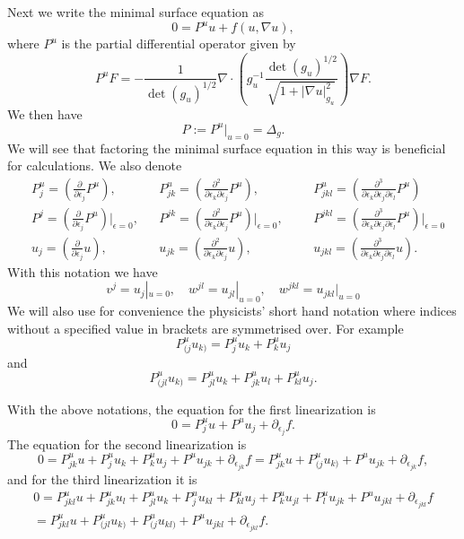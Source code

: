 \documentclass[12pt]{amsart}
\def\p{\partial}
\theoremstyle{definition}
\theoremstyle{remark}
\newcommand{\abs}[1]{\lvert #1 \rvert}
\newcommand{\eps}{\epsilon}
\begin{document}
Next we write the minimal surface equation as 
\begin{equation*}%
 0=%
 P^uu+f(u,\nabla u ), 
\end{equation*}
where $P^u$ is the partial differential operator given by
\[
 P^uF=-\frac{1}{\det(g_u)^{1/2}}\nabla\cdot \left( g_u^{-1}\frac{\det(g_u)^{1/2}}{\sqrt{1+\abs{\nabla u}^2_{g_u}}} \right)\nabla F. 
\]
We then have
\[
 P:=P^{u}|_{u=0}=\Delta_g.
\]
We will see that factoring the minimal surface equation in this way is beneficial for calculations.  We also denote
\begin{align*}
 &P_{j}^u=\left(\frac{\p}{\p \eps_j}P^u\right), && P_{jk}^u=\left(\frac{\p^2}{\p \eps_k \p \eps_j}P^u\right),  &&& P_{jkl}^u=\left(\frac{\p^3}{\p \eps_k \p \eps_j\p\eps_l}P^u\right) \\ 
 &P^j=\left(\frac{\p}{\p \eps_j}P^u\right)\Big|_{\eps=0}, && P^{jk}=\left(\frac{\p^2}{\p \eps_k \p \eps_j}P^u\right)\Big|_{\eps=0},  &&& P^{jkl}=\left(\frac{\p^3}{\p \eps_k \p \eps_j\p\eps_l}P^u\right)\Big|_{\eps=0} \\
 &u_j=\left(\frac{\p}{\p \eps_j}u\right), && u_{jk}=\left(\frac{\p^2}{\p \eps_k \p \eps_j}u\right), &&& u_{jkl}=\left(\frac{\p^3}{\p \eps_k \p \eps_j\p \eps_l}u\right).
\end{align*}
With this notation we have
\[
 v^{j}=u_j|_{u=0}, \quad w^{jl}=u_{jl}|_{u=0}, \quad w^{jkl}=u_{jkl}|_{u=0}
\]
We will also use for convenience the physicists' short hand notation where indices without a specified value in brackets are symmetrised over. For example
\[
 P^u_{(j}u_{k)}=P^u_{j}u_{k}+P^u_{k}u_{j}
\]
and
\[
 P^u_{(jl}u_{k)}=P^u_{jl}u_{k}+P^u_{jk}u_{l}+P^u_{kl}u_{j}.
\]



With the above notations, the equation for the first linearization is
\[
 0=P_j^uu+P^uu_j+\p_{\eps_j}f.
\]
The equation for the second linearization is
\[
 0=P_{jk}^uu+P_{j}^uu_{k} +P_k^uu_j +P^u u_{jk}+\p_{\eps_{jk}}f =P^u_{jk}u+P^u_{(j}u_{k)}+P^u u_{jk}+\p_{\eps_{jk}}f,
 \]
and for the third linearization it is 
\begin{multline*}
 0=P_{jkl}^uu+P_{jk}^uu_l+P_{jl}^uu_{k}+P_{j}^uu_{kl}+P_{kl}^uu_{j}+P_k^uu_{jl}+P^u_{l}u_{jk}+P^u u_{jkl}+\p_{\eps_{jkl}}f\\
 =P^u_{jkl}u+P^u_{(jl}u_{k)}+P^u_{(j}u_{kl)}+P^u u_{jkl}+\p_{\eps_{jkl}}f.
\end{multline*}
\end{document}

